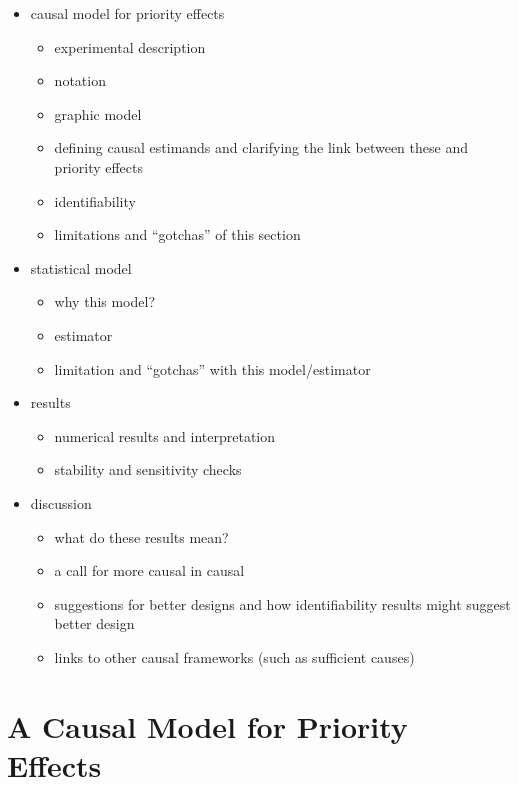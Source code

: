 \documentclass[]{article}
\providecommand{\tightlist}{%
  \setlength{\itemsep}{0pt}\setlength{\parskip}{0pt}}
\begin{document}
\begin{itemize}
\tightlist
\item
  causal model for priority effects

  \begin{itemize}
  \tightlist
  \item
    experimental description
  \item
    notation
  \item
    graphic model
  \item
    defining causal estimands and clarifying the link between these and
    priority effects
  \item
    identifiability
  \item
    limitations and ``gotchas'' of this section
  \end{itemize}
\item
  statistical model

  \begin{itemize}
  \tightlist
  \item
    why this model?
  \item
    estimator
  \item
    limitation and ``gotchas'' with this model/estimator
  \end{itemize}
\item
  results

  \begin{itemize}
  \tightlist
  \item
    numerical results and interpretation
  \item
    stability and sensitivity checks
  \end{itemize}
\item
  discussion

  \begin{itemize}
  \tightlist
  \item
    what do these results mean?
  \item
    a call for more causal in causal
  \item
    suggestions for better designs and how identifiability results might
    suggest better design
  \item
    links to other causal frameworks (such as sufficient causes)
  \end{itemize}
\end{itemize}

\section{A Causal Model for Priority
Effects}\label{a-causal-model-for-priority-effects}
\end{document}
